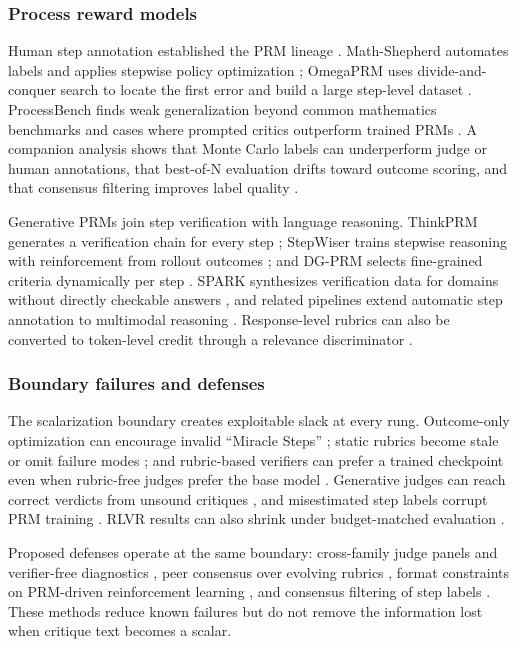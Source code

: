 \subsubsection{Process reward models}
\label{supp:subsec:reward-process}

Human step annotation established the PRM lineage \citep{lightman2024let}. Math-Shepherd automates labels and applies stepwise policy optimization \citep{wang2024mathshepherd}; OmegaPRM uses divide-and-conquer search to locate the first error and build a large step-level dataset \citep{luo2024improve}. ProcessBench finds weak generalization beyond common mathematics benchmarks and cases where prompted critics outperform trained PRMs \citep{zheng2024processbench}. A companion analysis shows that Monte Carlo labels can underperform judge or human annotations, that best-of-N evaluation drifts toward outcome scoring, and that consensus filtering improves label quality \citep{zhang2025lessons}.

Generative PRMs join step verification with language reasoning. ThinkPRM generates a verification chain for every step \citep{khalifa2025processrewardmodelsthink}; StepWiser trains stepwise reasoning with reinforcement from rollout outcomes \citep{xiong2025stepwiser}; and DG-PRM selects fine-grained criteria dynamically per step \citep{yin2025dynamic}. SPARK synthesizes verification data for domains without directly checkable answers \citep{rahman2025spark}, and related pipelines extend automatic step annotation to multimodal reasoning \citep{du2025mmprm}. Response-level rubrics can also be converted to token-level credit through a relevance discriminator \citep{xu2026rubrics}.

\subsubsection{Boundary failures and defenses}
\label{supp:subsec:reward-boundary}

The scalarization boundary creates exploitable slack at every rung. Outcome-only optimization can encourage invalid ``Miracle Steps'' \citep{yuan2025curing}; static rubrics become stale or omit failure modes \citep{rezaei2025online}; and rubric-based verifiers can prefer a trained checkpoint even when rubric-free judges prefer the base model \citep{mahmoud2026reward}. Generative judges can reach correct verdicts from unsound critiques \citep{wang2026reward}, and misestimated step labels corrupt PRM training \citep{zhang2025lessons}. RLVR results can also shrink under budget-matched evaluation \citep{wu2025position}.

Proposed defenses operate at the same boundary: cross-family judge panels and verifier-free diagnostics \citep{mahmoud2026reward}, peer consensus over evolving rubrics \citep{guan2026evorubric}, format constraints on PRM-driven reinforcement learning \citep{rahman2025spark}, and consensus filtering of step labels \citep{zhang2025lessons}. These methods reduce known failures but do not remove the information lost when critique text becomes a scalar.

